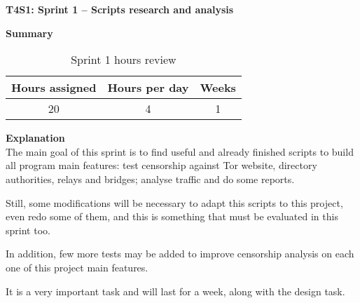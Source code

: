\textbf{T4S1: Sprint 1 – Scripts research and analysis}

\textbf{Summary}
\begin{table}[ht]
\centering
  \begin{tabular}{| c | c | c |}
  \hline Hours assigned & Hours per day & Weeks \\ \hline  
   20 & 4 & 1        \\ \hline
  \end{tabular}
  \caption{Sprint 1 hours review} \vspace{3pt}
  \label{tab:sprint1}
\end{table}

\textbf{Explanation}\\
The main goal of this sprint is to find useful and already finished scripts to build all program main features: test censorship against Tor website, directory authorities, relays and bridges; analyse traffic and do some reports.

Still, some modifications will be necessary to adapt this scripts to this project, even redo some of them, and this is something that must be evaluated in this sprint too.

In addition, few more tests may be added to improve censorship analysis on each one of this project main features.

It is a very important task and will last for a week, along with the design task.
